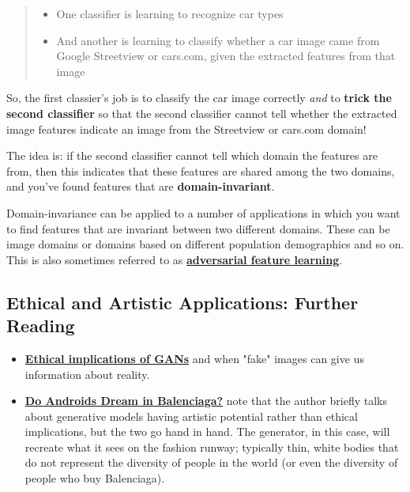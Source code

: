 \begin{quote}

\begin{itemize}
    \item One classifier is learning to recognize car types
    \item And another is learning to classify whether a car image came from Google Streetview or cars.com, given the extracted features from that image
\end{itemize}

\end{quote}

So, the first classier’s job is to classify the car image correctly \textit{and} to \textbf{trick the second classifier} so that the second classifier cannot tell whether the extracted image features indicate an image from the Streetview or cars.com domain! \newline

The idea is: if the second classifier cannot tell which domain the features are from, then this indicates that these features are shared among the two domains, and you’ve found features that are \textbf{domain-invariant}. \newline

Domain-invariance can be applied to a number of applications in which you want to find features that are invariant between two different domains. These can be image domains or domains based on different population demographics and so on. This is also sometimes referred to as \href{https://arxiv.org/pdf/1705.11122.pdf}{\textbf{adversarial feature learning}}.
\subsection{Ethical and Artistic Applications: Further Reading}
\begin{itemize}
    \item \href{https://www.newyorker.com/magazine/2018/11/12/in-the-age-of-ai-is-seeing-still-believing}{\textbf{Ethical implications of GANs}} and when "fake" images can give us information about reality.
    \item \href{https://www.ssense.com/en-us/editorial/fashion/do-androids-dream-of-balenciaga-ss29}{\textbf{Do Androids Dream in Balenciaga?}} note that the author briefly talks about generative models having artistic potential rather than ethical implications, but the two go hand in hand. The generator, in this case, will recreate what it sees on the fashion runway; typically thin, white bodies that do not represent the diversity of people in the world (or even the diversity of people who buy Balenciaga).
\end{itemize}

